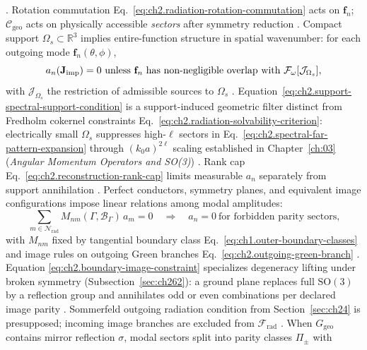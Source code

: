 \cite{stratton1941}. Rotation commutation Eq.~\eqref{eq:ch2.radiation-rotation-commutation}
acts on \(\mathbf{f}_n\); \(\mathcal{C}_{\mathrm{geo}}\) acts on physically accessible
\emph{sectors}
after symmetry reduction \cite{harrington2001}.
Compact support \(\Omega_s\subset\mathbb{R}^{3}\) implies entire-function structure in
spatial wavenumber: for each outgoing mode \(\mathbf{f}_n(\theta,\phi)\),
\begin{equation}
\label{eq:ch2.support-spectral-support-condition}
a_n(\Jimp)=0
\ \text{unless}\ 
\mathbf{f}_n\ \text{has non-negligible overlap with}\ 
\mathcal{F}_\omega[\mathcal{J}_{\Omega_s}],
\end{equation}
with \(\mathcal{J}_{\Omega_s}\) the restriction of admissible sources to \(\Omega_s\)
\cite{stratton1941}. Equation~\eqref{eq:ch2.support-spectral-support-condition}
is a support-induced geometric filter distinct from Fredholm cokernel constraints
Eq.~\eqref{eq:ch2.radiation-solvability-criterion}: electrically small \(\Omega_s\)
suppresses high-\(\ell\) sectors in Eq.~\eqref{eq:ch2.spectral-far-pattern-expansion}
through \((k_0 a)^{2\ell}\) scaling established in Chapter~\ref{ch:03} (\emph{Angular Momentum Operators and SO(3)})
\cite{jackson1999}. Rank cap Eq.~\eqref{eq:ch2.reconstruction-rank-cap}
limits measurable \(a_n\) separately from support annihilation
\cite{harrington2001}.
Perfect conductors, symmetry planes, and equivalent image configurations impose linear
relations among modal amplitudes:
\begin{equation}
\label{eq:ch2.boundary-image-constraint}
\sum_{m\in\mathcal{N}_{\mathrm{rad}}}
M_{nm}(\Gamma,\mathcal{B}_\Gamma)\,a_m=0
\quad\Longrightarrow\quad
a_n=0\ \text{for forbidden parity sectors,}
\end{equation}
with \(M_{nm}\) fixed by tangential boundary class
Eq.~\eqref{eq:ch1.outer-boundary-classes} and image rules on outgoing Green branches
Eq.~\eqref{eq:ch2.outgoing-green-branch} \cite{stratton1941}. Equation
\eqref{eq:ch2.boundary-image-constraint} specializes degeneracy lifting under broken symmetry (Subsection~\ref{sec:ch262}): a ground plane replaces full
\(\mathrm{SO}(3)\) by a reflection group and annihilates odd or even combinations per
declared image parity \cite{stratton1941}. Sommerfeld outgoing radiation condition from
Section~\ref{sec:ch24} is presupposed; incoming image branches are excluded from
\(\mathcal{F}_{\mathrm{rad}}\) \cite{harrington2001}.
When \(G_{\mathrm{geo}}\) contains mirror reflection \(\sigma\), modal sectors split into
parity classes \(\Pi_\pm\) with
